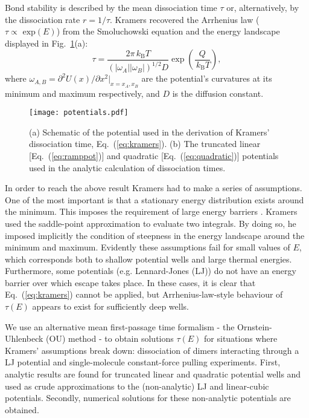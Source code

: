 \documentclass[twocolumn,pre,aps,showpacs,a4paper,floatfix,amssymb]{revtex4-1}
\newcommand{\kBT}{\,k_\mathrm{B}T}
\newcommand{\refeq}[1]{Eq.~(\ref{#1})}
\newcommand{\refig}[1]{Fig.~\ref{#1}}
\newcommand{\MAi}[1]{#1} %
\begin{document}
Bond stability is described by the mean dissociation time $\tau$ or, alternatively, by the dissociation rate $r=1/\tau$.
Kramers \cite{kramers1940brownian} recovered the Arrhenius law \cite{arrhenius1889reaktionsgeschwindigkeit} ($\tau \propto \text{ exp}(E)$) from the Smoluchowski equation and the energy landscape displayed in \refig{fig:kramers}(a):
\begin{equation}
\tau=\frac{2\pi\kBT}{(|\omega_A| |\omega_B|)^{1/2}D} \exp\left(\frac{Q}{\kBT}\right),
\label{eq:kramers}
\end{equation}
where 
$\omega_{A,B}=\partial^2 U(x)/\partial x^2 |_{x=x_A,x_B}$ are the potential's curvatures at its minimum  and maximum respectively, and $D$ is the diffusion constant.


\begin{figure}
\texttt{[image: potentials.pdf]}
\caption{
(a) Schematic of the potential used in the derivation of Kramers' dissociation time, \refeq{eq:kramers}. 
\MAi{(b)} The truncated linear [\refeq{eq:ramppot}] and quadratic [\refeq{eq:quadratic}] potentials used in the analytic calculation of dissociation times.
}
\label{fig:kramers}
\end{figure}

In order to reach the above result Kramers had to make a series of assumptions. One of the most important is that a stationary energy distribution exists around the minimum. This imposes the requirement of large energy barriers \cite{kramers1940brownian,hanggi1990reaction}. Kramers used the saddle-point approximation to evaluate two integrals. By doing so, he imposed implicitly the condition of steepness in the energy landscape around the minimum and maximum. Evidently these assumptions fail for small values of $E$, which corresponds both to shallow potential wells and large thermal energies. Furthermore, some potentials (e.g. Lennard-Jones (LJ)) do not have an energy barrier over which escape takes place. In these cases, it is clear that \refeq{eq:kramers} cannot be applied, but Arrhenius-law-style behaviour of $\tau(E)$ appears to exist for sufficiently deep wells.


We use an alternative mean first-passage time formalism - the Ornstein-Uhlenbeck (OU) method - to obtain solutions $\tau(E)$ for situations where Kramers' assumptions break down: dissociation of dimers interacting through a LJ potential and single-molecule constant-force pulling experiments. First, analytic results are found for truncated linear and quadratic potential wells and used as crude approximations to the (non-analytic) LJ and linear-cubic potentials. Secondly, numerical solutions for these non-analytic potentials are obtained.
\end{document}
